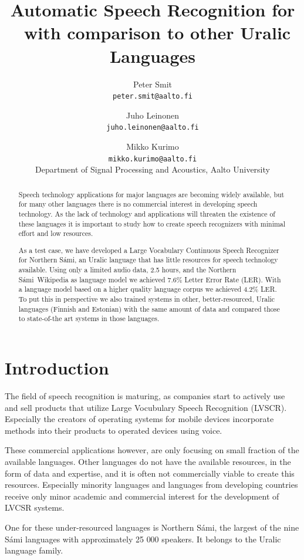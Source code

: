 \documentclass[b5paper]{article}
\title{Automatic Speech Recognition for \ns\ with comparison to other Uralic Languages}
\author{Peter Smit \\ \texttt{peter.smit@aalto.fi} \and Juho Leinonen \\ \texttt{juho.leinonen@aalto.fi} \and Mikko Kurimo\\ \texttt{mikko.kurimo@aalto.fi}  \\
[0.5cm]Department of Signal Processing and Acoustics, Aalto University\\}
\newcommand{\ns}{Northern Sámi}
\begin{document}
\maketitle

\begin{abstract} 
Speech technology applications for major languages are becoming widely available, but for many other languages there is no commercial interest in developing speech technology. As the lack of technology and applications will threaten the existence of these languages it is important to study how to create speech recognizers with minimal effort and low resources.

As a test case, we have developed a Large Vocabulary Continuous Speech Recognizer for \ns, an Uralic language that has little resources for speech technology available. Using only a limited audio data, 2.5 hours, and the \ns\ Wikipedia as language model we achieved 7.6\% Letter Error Rate (LER). With a language model based on a higher quality language corpus we achieved 4.2\% LER. To put this in perspective we also trained systems in other, better-resourced, Uralic languages (Finnish and Estonian) with the same amount of data and compared those to state-of-the art systems in those languages. 
\end{abstract}

\section{Introduction}

The field of speech recognition is maturing, as companies start to actively use and sell products that utilize Large Vocubulary Speech Recognition (LVSCR). Especially the creators of operating systems for mobile devices incorporate methods into their products to operated devices using voice.

These commercial applications however, are only focusing on small fraction of the available languages. Other languages do not have the available resources, in the form of data and expertise, and it is often not commercially viable to create this resources. Especially minority languages and languages from developing countries receive only minor academic and commercial interest for the development of LVCSR systems. \cite{besacier2014automatic}

One for these under-resourced languages is \ns, the largest of the nine Sámi languages with approximately 25 000 speakers. It belongs to the Uralic language family. \cite{ethno18}
\end{document}
